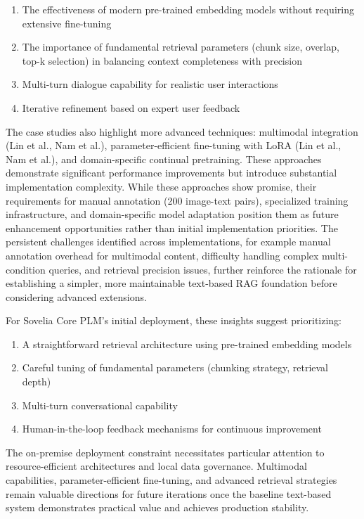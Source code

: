\begin{enumerate}
    \item The effectiveness of modern pre-trained embedding models without requiring extensive fine-tuning
    \item The importance of fundamental retrieval parameters (chunk size, overlap, top-k selection) in balancing context completeness with precision
    \item Multi-turn dialogue capability for realistic user interactions
    \item Iterative refinement based on expert user feedback
\end{enumerate}

The case studies also highlight more advanced techniques: multimodal integration (Lin et al., Nam et al.), parameter-efficient fine-tuning with LoRA (Lin et al., Nam et al.), and domain-specific continual pretraining. These approaches demonstrate significant performance improvements but introduce substantial implementation complexity. While these approaches show promise, their requirements for manual annotation (200 image-text pairs), specialized training infrastructure, and domain-specific model adaptation position them as future enhancement opportunities rather than initial implementation priorities. The persistent challenges identified across implementations, for example manual annotation overhead for multimodal content, difficulty handling complex multi-condition queries, and retrieval precision issues, further reinforce the rationale for establishing a simpler, more maintainable text-based RAG foundation before considering advanced extensions.

For Sovelia Core PLM's initial deployment, these insights suggest prioritizing:

\begin{enumerate}
    \item A straightforward retrieval architecture using pre-trained embedding models
    \item Careful tuning of fundamental parameters (chunking strategy, retrieval depth)
    \item Multi-turn conversational capability
    \item Human-in-the-loop feedback mechanisms for continuous improvement
\end{enumerate}

The on-premise deployment constraint necessitates particular attention to resource-efficient architectures and local data governance. Multimodal capabilities, parameter-efficient fine-tuning, and advanced retrieval strategies remain valuable directions for future iterations once the baseline text-based system demonstrates practical value and achieves production stability.

